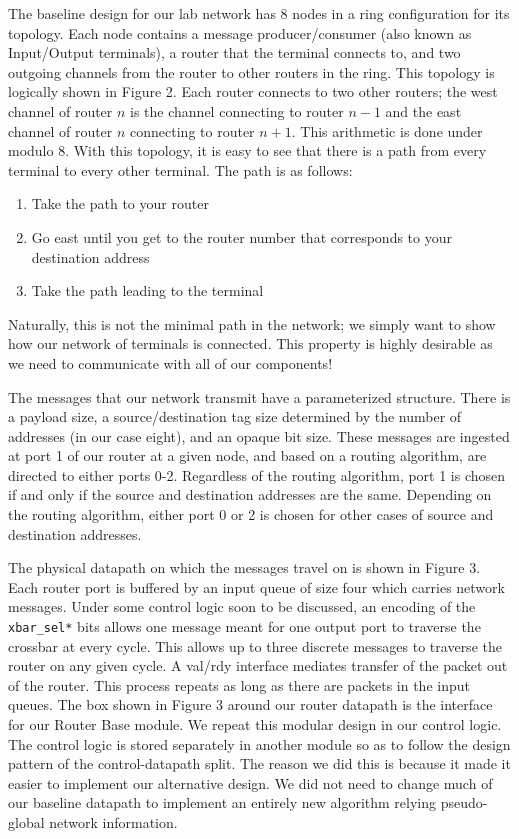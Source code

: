 \documentclass[10pt]{article}
\begin{document}
The baseline design for our lab network has 8 nodes in a ring configuration
for its topology. 
Each node contains a message producer/consumer (also known as Input/Output 
terminals), a router that the terminal connects to,
and two outgoing channels from the router to other routers in the ring.
This topology is logically shown in Figure 2. 
Each router connects to two other routers; the west channel of router $n$ 
is the channel connecting to router $n-1$ and 
the east channel of router $n$ connecting to router $n+1$.
This arithmetic is done under modulo 8.
With this topology, it is easy to see that there is a path from every terminal
to every other terminal.
The path is as follows:
\begin{enumerate}[nolistsep]
	\item Take the path to your router
	\item Go east until you get to the router number that corresponds to your 
		  destination address
	\item Take the path leading to the terminal
\end{enumerate}
Naturally, this is not the minimal path in the network; we simply want to show
how our network of terminals is connected.
This property is highly desirable as we need to communicate with 
all of our components! \par

The messages that our network transmit have a parameterized structure.
There is a payload size, a source/destination tag size determined by the number
of addresses (in our case eight), and an opaque bit size.
These messages are ingested at port 1 of our router at a given node, and based
on a routing algorithm, are directed to either ports 0-2.
Regardless of the routing algorithm, port 1 is chosen if and only if 
the source and destination addresses are the same.
Depending on the routing algorithm, either port 0 or 2 is chosen for other
cases of source and destination addresses. \par

The physical datapath on which the messages travel on is shown in Figure 3.
Each router port is buffered by an input queue of size four which carries
network messages. 
Under some control logic soon to be discussed, an encoding of the 
\texttt{xbar\_sel*} bits allows one message meant for one output port to
traverse the crossbar at every cycle.
This allows up to three discrete messages to traverse the router on any 
given cycle.
A val/rdy interface mediates transfer of the packet out of the router. 
This process repeats as long as there are packets in the input queues.
The box shown in Figure 3 around our router datapath is the interface for our 
Router Base module. 
We repeat this modular design in our control logic.
The control logic is stored separately in another module so as to follow the
design pattern of the control-datapath split. 
The reason we did this is because it made it easier to implement our 
alternative design.
We did not need to change much of our baseline datapath to implement an 
entirely new algorithm relying pseudo-global network information. \par
\end{document}
